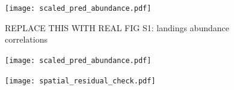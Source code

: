\documentclass[12pt]{article}
\renewcommand{\figurename}{Figure}
\begin{document}
\renewcommand{\thefigure}{S\arabic{figure}}
\renewcommand{\figurename}{Figure}
\setcounter{figure}{0}  %

\begin{figure}[htbp]
  \centering
    \texttt{[image: scaled\_pred\_abundance.pdf]}
  \caption{REPLACE THIS WITH REAL FIG S1: landings abundance correlations}
  \label{fig:ind.predators.corrs.pdf}
\end{figure}

\begin{figure}[htbp]
  \centering
    \texttt{[image: scaled\_pred\_abundance.pdf]}
  \caption{}
  \label{fig:ind.predators.corrs.pdf}
\end{figure}

\begin{figure}[htbp]
  \centering
    \texttt{[image: spatial\_residual\_check.pdf]}
  \caption{}
  \label{fig:ind.predators.corrs.pdf}
\end{figure}







%
\end{document}

